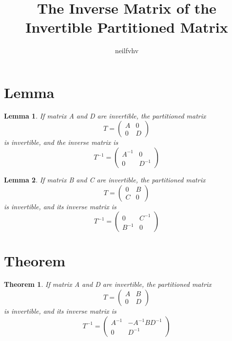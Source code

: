 \documentclass{article}
\title{The Inverse Matrix of the Invertible Partitioned Matrix}
\author{neilfvhv}
\newtheorem{lemma}{Lemma}
\newtheorem{theorem}{Theorem}
\begin{document}
\maketitle

\section{Lemma}

    \begin{lemma}
        If matrix A and D are invertible, the partitioned matrix
        $$
            T =
            \begin{pmatrix}
                A & 0 \\
                0 & D
            \end{pmatrix}
        $$
        is invertible, and the inverse matrix is
        $$
            T^{-1} =
            \begin{pmatrix}
                A^{-1} & 0 \\
                0 & D^{-1}
            \end{pmatrix}
        $$
    \end{lemma}

    \begin{lemma}
        If matrix B and C are invertible, the partitioned matrix
        $$
            T =
            \begin{pmatrix}
                0 & B \\
                C & 0
            \end{pmatrix}
        $$
        is invertible, and its inverse matrix is
        $$
            T^{-1} =
            \begin{pmatrix}
                0 & C^{-1} \\
                B^{-1} & 0
            \end{pmatrix}
        $$
    \end{lemma}

\section{Theorem}

    \begin{theorem}
        If matrix A and D are invertible, the partitioned matrix
        $$
            T =
            \begin{pmatrix}
                A & B \\
                0 & D
            \end{pmatrix}
        $$
        is invertible, and its inverse matrix is
        $$
            T^{-1} =
            \begin{pmatrix}
                A^{-1} & -A^{-1} B D^{-1} \\
                0 & D^{-1}
            \end{pmatrix}
        $$
    \end{theorem}
\end{document}
